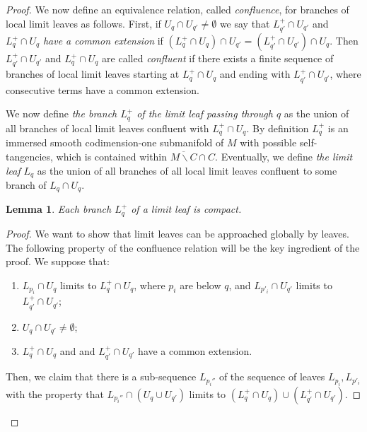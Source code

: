 \documentclass[JEP,XML,SOM,Unicode]{cedram}
\let\moins\smallsetminus
\newtheorem{lemma}[theorem]{Lemma}
\theoremstyle{definition}
\theoremstyle{remark}
\numberwithin{equation}{section}
\begin{document}
\begin{proof}
We now define an equivalence relation, called \emph{confluence},
for branches of local limit leaves as follows.
First, if $U_q\cap U_{q'}\neq \emptyset$
we say that $L^+_{q'}\cap U_{q'}$ and $L^+_{q}\cap U_{q}$ \emph{have a common extension} if
$(L^+_{q}\cap U_{q})\cap U_{q'}=(L^+_{q'}\cap U_{q'})\cap U_{q}$.
Then $L^+_{q'}\cap U_{q'}$ and $L^+_{q}\cap U_{q}$ are
called \emph{confluent} if there exists a finite sequence of branches of local limit leaves
starting at $L^+_{q}\cap U_{q}$ and ending with $L^+_{q'}\cap U_{q'}$, where
consecutive terms have a common extension.\enlargethispage{.5\baselineskip}%

We now define \emph{the branch $L_q^+$ of the limit leaf passing through $q$} as the union of all branches of local limit leaves confluent with $L^+_{q}\cap U_{q}$.
By definition $L_q^+$ is an immersed smooth codimension-one submanifold of $M$ with possible self-tangencies,
which is contained within $\overline{M\moins C}\cap C$.
Eventually, we define \emph{the limit leaf} $L_q$ as the union of all branches of
all local limit leaves confluent to some branch of $L_q\cap U_q$.

\begin{lemma}\label{compactlimitleaf}
Each branch $L^+_q$ of a limit leaf is compact.
\end{lemma}
\begin{proof}
We want to show that limit leaves can be approached globally by leaves.
The following property of the confluence relation will be the key ingredient of the proof.
We suppose that:
\begin{enumerate}
\item $L_{p_i}\cap U_q$ limits to $L_q^+\cap U_q$, where $p_i$ are below $q$,
and $L_{p'_i}\cap U_{q'}$ limits to $L_{q'}^+\cap U_{q'}$;
\item $U_q\cap U_{q'}\neq \emptyset$;
\item $L_q^+\cap U_q$ and
and $L_{q'}^+\cap U_{q'}$ have a common extension.
\end{enumerate}
Then, we claim that there is a sub-sequence $L_{p_i''}$ of the sequence
of leaves $L_{p_i}, L_{p'_i}$ with the property that
$L_{p_i''}\cap (U_q\cup U_{q'})$ limits to $(L^+_q\cap U_q) \cup (L^+_{q'}\cap U_{q'})$.


\end{proof}
\end{proof}
\end{document}
